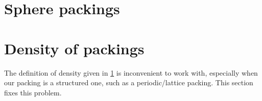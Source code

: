 \pagebreak
%
%
%
%
%
%
%
\section{Sphere packings}\label{sec:sphere-packings}





\pagebreak
\section{Density of packings}\label{sec:packings-density}

The definition of density given in \cref{sec:sphere-packings} is inconvenient to work with, especially when our packing is a structured one, such as a periodic/lattice packing. This section fixes this problem.

